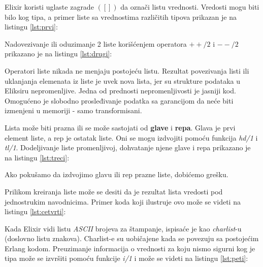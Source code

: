 \documentclass[12pt,oneside]{memoir}
\begin{document}
Elixir koristi uglaste zagrade $([])$ da označi listu vrednosti. Vredosti mogu biti bilo kog tipa, a primer liste sa vrednostima različitih tipova prikazan je na listingu \ref{lst:prvi}:

\newpage



Nadovezivanje ili oduzimanje 2 liste korišćenjem operatora $++/2$ i $--/2$ prikazano je na listingu \ref{lst:drugi}:



Operatori liste nikada ne menjaju postojeću listu. Rezultat povezivanja listi ili uklanjanja elemenata iz liste je uvek nova lista, jer su strukture podataka u Eliksiru nepromenljive. Jedna od prednosti nepromenljivosti je jasniji kod. Omogućeno je slobodno prosleđivanje podatka sa garancijom da neće biti izmenjeni u memoriji - samo transformisani.

Lista može biti prazna ili se može sastojati od \textbf{glave} i \textbf{repa}. Glava je prvi element liste, a rep je ostatak liste. Oni se mogu izdvojiti pomoću funkcija \textit{hd/1} i \textit{tl/1}. Dodeljivanje liste promenljivoj, dohvatanje njene glave i repa prikazano je na listingu \ref{lst:treci}:



Ako pokušamo da izdvojimo glavu ili rep prazne liste, dobićemo grešku.

Prilikom kreiranja liste može se desiti da je rezultat lista vredosti pod jednostrukim navodnicima. Primer koda koji ilustruje ovo može se videti na listingu \ref{lst:cetvrti}:



Kada Elixir vidi listu \textit{ASCII} brojeva za štampanje, ispisaće je kao \textit{charlist}-u (doslovno listu znakova). Charlist-e su uobičajene kada se povezuju sa postojećim Erlang kodom. Preuzimanje informacija o vrednosti za koju nismo sigurni kog je tipa može se izvršiti pomoću funkcije \textit{i/1} i može se videti na listingu \ref{lst:peti}:


\end{document}
